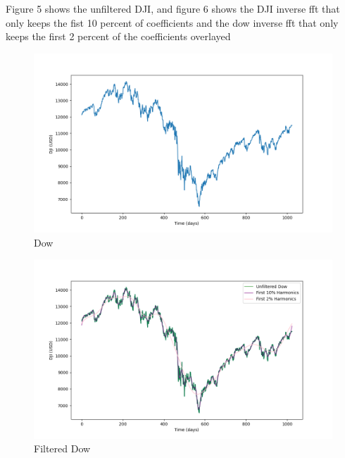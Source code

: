\documentclass{article}
\begin{document}
Figure 5 shows the unfiltered DJI, and figure 6 shows the DJI inverse fft that only keeps the fist 10 percent of coefficients and the dow inverse fft that only keeps the first 2 percent of the coefficients overlayed




\begin{figure}
    \centering
    \includegraphics[width=\linewidth]{dow.png}
    \caption{Dow}
    \label{fig:enter-label}
\end{figure}

\begin{figure}
    \centering
    \includegraphics[width=\linewidth]{dow_10.png}
    \caption{Filtered Dow}
    \label{fig:enter-label}
\end{figure}
\end{document}
